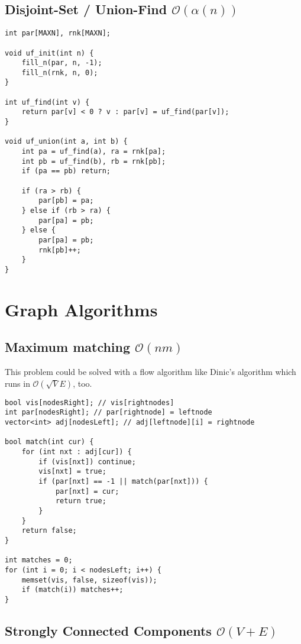 \documentclass{article}
\begin{document}
\subsection{Disjoint-Set / Union-Find $\mathcal{O}(\alpha (n))$}

\begin{lstlisting}
int par[MAXN], rnk[MAXN];

void uf_init(int n) {
	fill_n(par, n, -1);
	fill_n(rnk, n, 0);
}

int uf_find(int v) {
	return par[v] < 0 ? v : par[v] = uf_find(par[v]);
}

void uf_union(int a, int b) {
	int pa = uf_find(a), ra = rnk[pa];
	int pb = uf_find(b), rb = rnk[pb];
	if (pa == pb) return;

	if (ra > rb) {
		par[pb] = pa;
	} else if (rb > ra) {
		par[pa] = pb;
	} else {
		par[pa] = pb;
		rnk[pb]++;
	}
}
\end{lstlisting}

\section{Graph Algorithms}
\subsection{Maximum matching $\mathcal{O}(n m)$}

This problem could be solved with a flow algorithm like Dinic's algorithm which runs in $\mathcal{O} (\sqrt{V} E)$, too.

\begin{lstlisting}
bool vis[nodesRight]; // vis[rightnodes]
int par[nodesRight]; // par[rightnode] = leftnode
vector<int> adj[nodesLeft]; // adj[leftnode][i] = rightnode

bool match(int cur) {
	for (int nxt : adj[cur]) {
		if (vis[nxt]) continue;
		vis[nxt] = true;
		if (par[nxt] == -1 || match(par[nxt])) {
			par[nxt] = cur;
			return true;
		}
	}
	return false;
}

int matches = 0;
for (int i = 0; i < nodesLeft; i++) {
	memset(vis, false, sizeof(vis));
	if (match(i)) matches++;
}
\end{lstlisting}

\subsection{Strongly Connected Components $\mathcal{O}(V + E)$}
\end{document}
